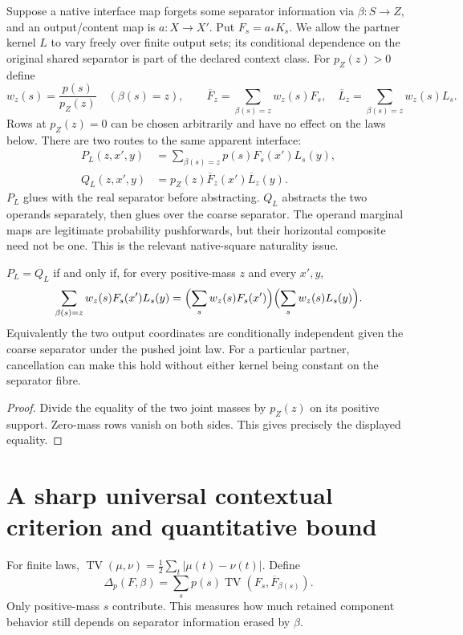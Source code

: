 \documentclass[11pt]{article}
\newcommand{\TV}{\operatorname{TV}}\newcommand{\Prob}{\mathsf{Prob}}
\begin{document}
Suppose a native interface map forgets some separator information via $\beta:S\to Z$, and an output/content map is $a:X\to X'$. Put $F_s=a_*K_s$. We allow the partner kernel $L$ to vary freely over finite output sets; its conditional dependence on the original shared separator is part of the declared context class. For $p_Z(z)>0$ define
\[
 w_z(s)=\frac{p(s)}{p_Z(z)}\quad(\beta(s)=z),\qquad
 \overline F_z=\sum_{\beta(s)=z}w_z(s)F_s,
 \quad\overline L_z=\sum_{\beta(s)=z}w_z(s)L_s.
\]
Rows at $p_Z(z)=0$ can be chosen arbitrarily and have no effect on the laws below. There are two routes to the same apparent interface:
\begin{align*}
 P_L(z,x',y)&=\sum_{\beta(s)=z}p(s)F_s(x')L_s(y),\\
 Q_L(z,x',y)&=p_Z(z)\overline F_z(x')\overline L_z(y).
\end{align*}
$P_L$ glues with the real separator before abstracting. $Q_L$ abstracts the two operands separately, then glues over the coarse separator. The operand marginal maps are legitimate probability pushforwards, but their horizontal composite need not be one. This is the relevant native-square naturality issue.

\begin{proposition}\label{sep-specified}
$P_L=Q_L$ if and only if, for every positive-mass $z$ and every $x',y$,
\[
 \sum_{\beta(s)=z}w_z(s)F_s(x')L_s(y)
 =\Bigl(\sum_s w_z(s)F_s(x')\Bigr)
  \Bigl(\sum_s w_z(s)L_s(y)\Bigr).
\]
Equivalently the two output coordinates are conditionally independent given the coarse separator under the pushed joint law. For a particular partner, cancellation can make this hold without either kernel being constant on the separator fibre.
\end{proposition}
\begin{proof}
Divide the equality of the two joint masses by $p_Z(z)$ on its positive support. Zero-mass rows vanish on both sides. This gives precisely the displayed equality.
\end{proof}

\section{A sharp universal contextual criterion and quantitative bound}
For finite laws, $\TV(\mu,\nu)=\frac12\sum_t|\mu(t)-\nu(t)|$. Define
\[
 \Delta_p(F,\beta)=\sum_s p(s)\TV(F_s,\overline F_{\beta(s)}).
\]
Only positive-mass $s$ contribute. This measures how much retained component behavior still depends on separator information erased by $\beta$.
\end{document}
